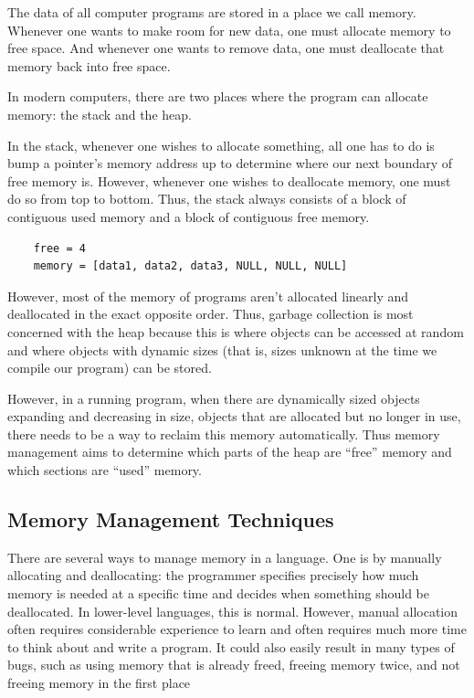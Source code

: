 \documentclass[index]{subfiles}
\begin{document}
The data of all computer programs are stored in a place we call memory. Whenever one wants to make room for new data, one must allocate memory to free space. And whenever one wants to remove data, one must deallocate that memory back into free space.

In modern computers, there are two places where the program can allocate memory: the stack and the heap\cite{the_rust_programming_language}.

In the stack, whenever one wishes to allocate something, all one has to do is bump a pointer's memory address up to determine where our next boundary of free memory is\cite[Chapter~4.1~What~is~Ownership?]{the_rust_programming_language}. However, whenever one wishes to deallocate memory, one must do so from top to bottom. Thus, the stack always consists of a block of contiguous used memory and a block of contiguous free memory.

\begin{verbatim}
    free = 4
    memory = [data1, data2, data3, NULL, NULL, NULL]
\end{verbatim}

However, most of the memory of programs aren't allocated linearly and deallocated in the exact opposite order. Thus, garbage collection is most concerned with the heap because this is where objects can be accessed at random and where objects with dynamic sizes (that is, sizes unknown at the time we compile our program) can be stored.

However, in a running program, when there are dynamically sized objects expanding and decreasing in size, objects that are allocated but no longer in use, there needs to be a way to reclaim this memory automatically. Thus memory management aims to determine which parts of the heap are ``free'' memory and which sections are ``used'' memory.

\subsection{Memory Management Techniques}

There are several ways to manage memory in a language. One is by manually allocating and deallocating: the programmer specifies precisely how much memory is needed at a specific time and decides when something should be deallocated. In lower-level languages, this is normal. However, manual allocation often requires considerable experience to learn and often requires much more time to think about and write a program. It could also easily result in many types of bugs, such as using memory that is already freed, freeing memory twice, and not freeing memory in the first place \cites{garbage_collection_overview_uw}[Chapter~1]{gc_handbook}
\end{document}
